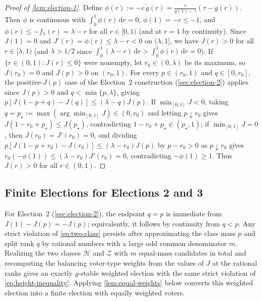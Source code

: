 \documentclass[11pt]{article}
\numberwithin{equation}{section}
\theoremstyle{plain}
\theoremstyle{definition}
\newcommand{\1}{\mathbf{1}}
\newcommand{\calH}{\mathcal{H}}
\newcommand{\calZ}{\mathcal{Z}}
\begin{document}
\begin{proof}[Proof of {\cref{lem:election-1}}]
Define $\phi(r) := -c\,\widetilde{g}(r) = \frac{c}{g(1) - \tau}(\tau - g(r))$. Then $\phi$ is continuous with $\int_0^1 \phi(r)\,\mathrm{d}r = 0$, $\phi(1) = -c \le -1$, and $\phi(r) \le -f_\lambda(r) = \lambda - r$ for all $r \in [0, 1)$ (and at $r = 1$ by continuity). Since $J(1) = 0$ and $J'(r) = \phi(r) \le \lambda - r < 0$ on $(\lambda, 1]$, we have $J(r) > 0$ for all $r \in [\lambda, 1)$ (and $\lambda > 1/2$ since $\int_0^1 (\lambda - r)\,\mathrm{d}r > \int_0^1 \phi(r)\,\mathrm{d}r = 0$). If $\{r \in (0, 1) : J(r) \le 0\}$ were nonempty, let $r_0 \in (0, \lambda)$ be its maximum, so $J(r_0) = 0$ and $J(p) > 0$ on $(r_0, 1)$. For every $p \in (r_0, 1)$ and $q \in [0, r_0]$, the positive-$J(p)$ case of the Election~2 construction (\cref{sec:election-2}) applies since $J(p) > 0$ and $q < \min\{p, \lambda\}$, giving $p[J(1 - p + q) - J(q)] \le (\lambda - q)J(p)$. If $\min_{[0, 1]} J < 0$, taking $q = p_\star := \max(\arg\min_{[0, 1]} J) \in (0, r_0)$ and letting $p \downarrow r_0$ gives $J(1 - r_0 + p_\star) \le J(p_\star)$, contradicting $1 - r_0 + p_\star \in (p_\star, 1)$; if $\min_{[0, 1]} J = 0$, then $J(r_0) = J'(r_0) = 0$, and dividing $p[J(1 - p + r_0) - J(r_0)] \le (\lambda - r_0)J(p)$ by $p - r_0 > 0$ as $p \downarrow r_0$ gives $r_0(-\phi(1)) \le (\lambda - r_0)J'(r_0) = 0$, contradicting $-\phi(1) \ge 1$. Thus $J(r) > 0$ for all $r \in (0, 1)$.
\end{proof}

\subsection{Finite Elections for Elections 2 and 3}
\label{app:finite-two-three}

For Election~2 (\cref{sec:election-2}), the endpoint $q=p$ is immediate from $J(1)-J(p)=-J(p)$; equivalently, it follows by continuity from $q<p$. Any strict violation of \cref{eq:two-class} persists after approximating the class mass $p$ and split rank $q$ by rational numbers with a large odd common denominator $m$. Realizing the two classes $\calH$ and $\calZ$ with $m$ equal-mass candidates in total and recomputing the balancing voter-type weights from the values of $J$ at the rational ranks gives an exactly $g$-stable weighted election with the same strict violation of \cref{eq:height-inequality}. Applying \cref{lem:equal-weights} below converts this weighted election into a finite election with equally weighted voters.
\end{document}
